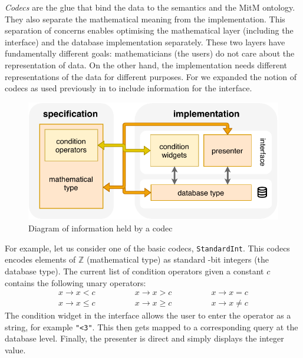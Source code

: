 \medskip

\emph{Codecs} are the glue that bind the data to the semantics and the MitM ontology.
They also separate the mathematical meaning from the implementation.
This separation of concerns enables optimising the mathematical layer (including the interface)
and the database implementation separately.
These two layers have fundamentally different goals: 
mathematicians (the users) do not care about the representation of data.
On the other hand, the implementation needs 
different representations of the data for different purposes.
For \dmh we expanded the notion of codecs as used previously in \pn to include information for the interface.
\begin{figure}[ht]
  \includegraphics{codec.pdf}
  \caption{Diagram of information held by a \dmh codec}\label{fig:codec}
\end{figure}

For example, let us consider one of the basic codecs, \texttt{StandardInt}.
This codecs encodes elements of $\mathbb{Z}$ (mathematical type) 
as standard -bit integers (the database type).
The current list of condition operators given a constant $c$ contains the following unary operators:
$$
\begin{array}{ccc}
x \rightarrow x < c \qquad & \qquad x \rightarrow x > c \qquad & \qquad x \rightarrow x = c \\
x \rightarrow x \leq c \qquad & \qquad x \rightarrow x \geq c \qquad & \qquad x \rightarrow x \neq c
\end{array}
$$
The condition widget in the interface allows the user to enter the operator as a string,
for example \texttt{"<3"}.
This then gets mapped to a corresponding query at the database level.
Finally, the presenter is direct and simply displays the integer value.


